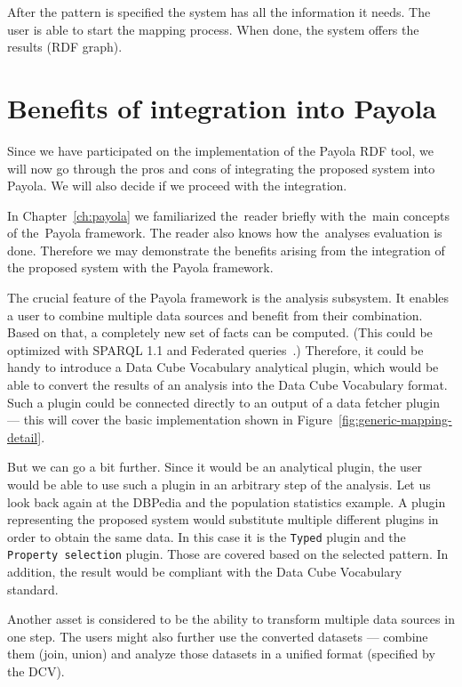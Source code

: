 After the pattern is specified the system has all the information it needs. The 
user is able to start the mapping process. When done, the system offers
the results (RDF graph).
\FloatBarrier

\section{Benefits of integration into Payola}
\label{why-payola}
Since we have participated on the implementation of the Payola RDF tool, we will 
now go through the pros and cons of integrating the proposed system into Payola.
We will also decide if we proceed with the integration.

In Chapter~\ref{ch:payola} we familiarized the~reader briefly with the~main
concepts of the~Payola framework. The reader also knows how the~analyses
evaluation is done. Therefore we may demonstrate the benefits arising from
the integration of the proposed system with the Payola framework.

The crucial feature of the Payola framework is the analysis subsystem. It enables a user
to combine multiple data sources and benefit from their 
combination. Based on that, a completely new set of facts can be computed.
(This could be optimized with SPARQL 1.1 and Federated queries~\cite{federated-queries}.) 
Therefore, it could be handy to introduce a Data Cube Vocabulary analytical 
plugin, which would be able to convert the results of an analysis into the Data 
Cube Vocabulary format. Such a plugin could be connected directly to an output
of a data fetcher plugin --- this will cover the basic implementation shown in 
Figure~\ref{fig:generic-mapping-detail}.

But we can go a bit further. Since it would be an analytical plugin, the user 
would be able to use such a plugin in an arbitrary step of the analysis. Let us look back again
at the DBPedia and the population statistics example. A plugin representing the proposed
system would substitute multiple different plugins 
in order to obtain the same data. In this case it is the \texttt{Typed}
plugin and the \texttt{Property selection} plugin. Those are covered based on the selected pattern.
In addition, the result would be 
compliant with the Data Cube Vocabulary standard.

Another asset is considered to be the ability to transform multiple data 
sources in one step. The users might also further use the converted datasets --- combine them
(join, union) and analyze those datasets in a unified format (specified by the DCV).

